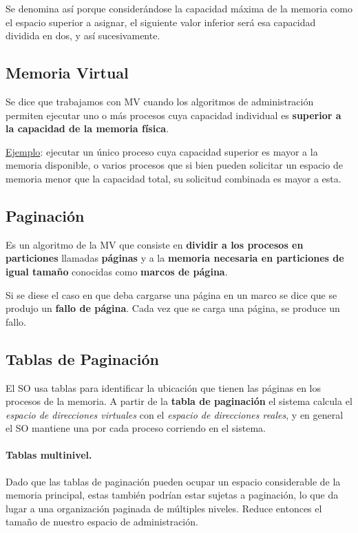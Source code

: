 \documentclass[10pt,a4paper]{article}
\begin{document}
Se denomina así porque considerándose la capacidad máxima de la memoria como el espacio superior a asignar, el siguiente valor inferior será esa capacidad dividida en dos, y así sucesivamente. 

\subsection{Memoria Virtual}
Se dice que trabajamos con MV cuando los algoritmos de administración permiten ejecutar uno o más procesos cuya capacidad individual es \textbf{superior a la capacidad de la memoria física}.

\underline{Ejemplo}: ejecutar un único proceso cuya capacidad superior es mayor a la memoria disponible, o varios procesos que si bien pueden solicitar un espacio de memoria menor que la capacidad total, su solicitud combinada es mayor a esta.

\subsection{Paginación}
Es un algoritmo de la MV que consiste en \textbf{dividir a los procesos en particiones} llamadas \textbf{páginas} y a la \textbf{memoria necesaria en particiones de igual tamaño} conocidas como \textbf{marcos de página}.

Si se diese el caso en que deba cargarse una página en un marco se dice que se produjo un \textbf{fallo de página}. Cada vez que se carga una página, se produce un fallo.

\subsection{Tablas de Paginación}

El SO usa tablas para identificar la ubicación que tienen las páginas en los procesos de la memoria. A partir de la \textbf{tabla de paginación} el sistema calcula el \textit{espacio de direcciones virtuales} con el \textit{espacio de direcciones reales}, y en general el SO mantiene una por cada proceso corriendo en el sistema.

\paragraph{Tablas multinivel.} Dado que las tablas de paginación pueden ocupar un espacio considerable de la memoria principal, estas también podrían estar sujetas a paginación, lo que da lugar a una organización paginada de múltiples niveles. Reduce entonces el tamaño de nuestro espacio de administración.
\end{document}
